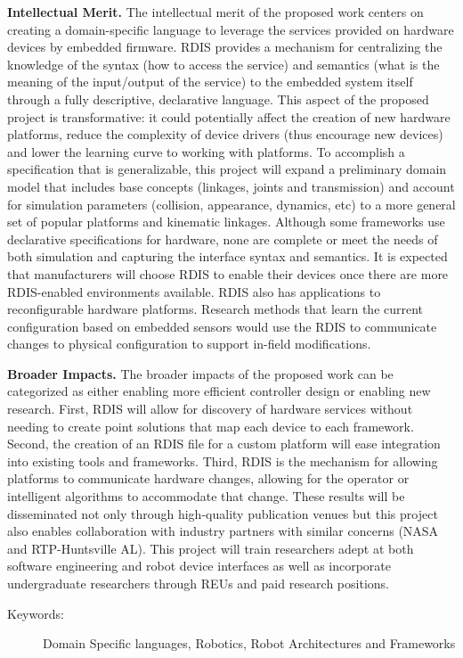 \textbf{Intellectual Merit.}
The intellectual merit of the proposed work centers on creating a domain-specific language to leverage the services provided on hardware devices by embedded firmware.  RDIS  provides a mechanism for centralizing the knowledge of the syntax (how to access the service) and semantics (what is the meaning of the input/output of the service) to the embedded system itself through a fully descriptive, declarative language.  This aspect of the proposed project is transformative: it could potentially affect the creation of new hardware platforms, reduce the complexity of device drivers (thus encourage new devices) and lower the learning curve to working with platforms.   To accomplish a specification that is generalizable, this project will expand a preliminary domain model that includes base concepts (linkages, joints and transmission) and account for simulation parameters (collision, appearance, dynamics, etc) to a more general set of popular platforms and kinematic linkages.  Although some frameworks use declarative specifications for hardware, none are complete or meet the needs of both simulation and capturing the interface syntax and semantics. It is expected that manufacturers will choose RDIS to enable their devices once there are more RDIS-enabled environments available.  RDIS also has applications to reconfigurable hardware platforms.  Research methods that learn the current configuration based on embedded sensors would use the RDIS to communicate changes to physical configuration to support in-field modifications.

\textbf{Broader Impacts.}
The broader impacts of the proposed work can be categorized as either enabling more efficient controller design or enabling new research.   First, RDIS will allow for discovery of hardware services without needing to create point solutions that map each device to each framework.  Second, the creation of an RDIS file for a custom platform will ease integration into existing tools and frameworks.  Third, RDIS is the mechanism for allowing platforms to communicate hardware changes, allowing for the operator or intelligent algorithms to accommodate that change.  These results will be disseminated not only through high-quality publication venues but this project also enables collaboration with industry partners with similar concerns (NASA and RTP-Huntsville AL).   This project will train researchers adept at both software engineering and robot device interfaces as well as incorporate undergraduate researchers through REUs and paid research positions.

\begin{description}
	\item[Keywords:]
   Domain Specific languages, Robotics, Robot Architectures and Frameworks
\end{description}
